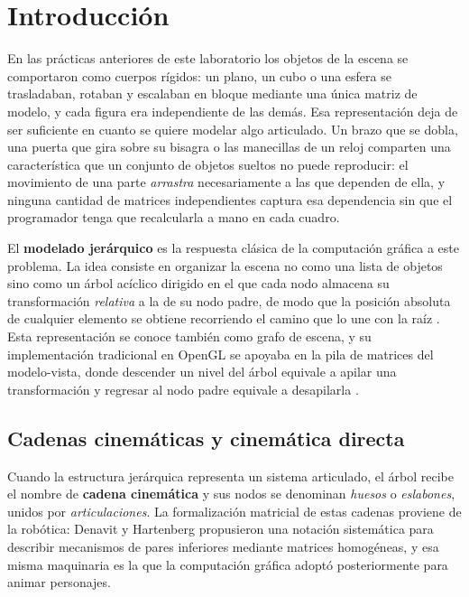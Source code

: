 
\section{Introducción}

En las prácticas anteriores de este laboratorio los objetos de la escena se comportaron como cuerpos rígidos: un plano, un cubo o una esfera se trasladaban, rotaban y escalaban en bloque mediante una única matriz de modelo, y cada figura era independiente de las demás. Esa representación deja de ser suficiente en cuanto se quiere modelar algo articulado. Un brazo que se dobla, una puerta que gira sobre su bisagra o las manecillas de un reloj comparten una característica que un conjunto de objetos sueltos no puede reproducir: el movimiento de una parte \textit{arrastra} necesariamente a las que dependen de ella, y ninguna cantidad de matrices independientes captura esa dependencia sin que el programador tenga que recalcularla a mano en cada cuadro.

El \textbf{modelado jerárquico} es la respuesta clásica de la computación gráfica a este problema. La idea consiste en organizar la escena no como una lista de objetos sino como un árbol acíclico dirigido en el que cada nodo almacena su transformación \textit{relativa} a la de su nodo padre, de modo que la posición absoluta de cualquier elemento se obtiene recorriendo el camino que lo une con la raíz \cite{foley1996}. Esta representación se conoce también como grafo de escena, y su implementación tradicional en OpenGL se apoyaba en la pila de matrices del modelo-vista, donde descender un nivel del árbol equivale a apilar una transformación y regresar al nodo padre equivale a desapilarla \cite{shreiner2013}.

\subsection{Cadenas cinemáticas y cinemática directa}

Cuando la estructura jerárquica representa un sistema articulado, el árbol recibe el nombre de \textbf{cadena cinemática} y sus nodos se denominan \textit{huesos} o \textit{eslabones}, unidos por \textit{articulaciones}. La formalización matricial de estas cadenas proviene de la robótica: Denavit y Hartenberg \cite{denavit1955} propusieron una notación sistemática para describir mecanismos de pares inferiores mediante matrices homogéneas, y esa misma maquinaria es la que la computación gráfica adoptó posteriormente para animar personajes.

